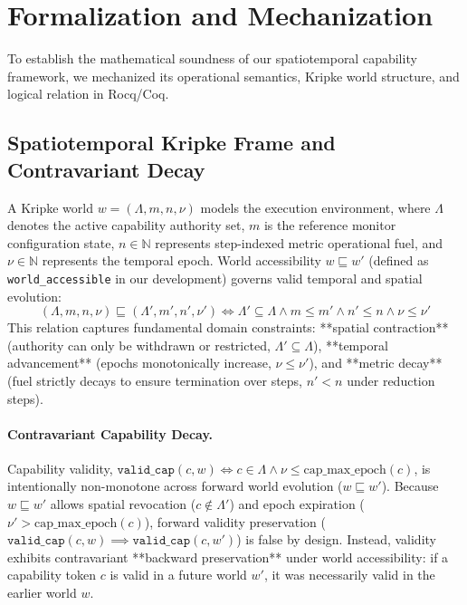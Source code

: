 \section{Formalization and Mechanization}
\label{sec:formalization}

To establish the mathematical soundness of our spatiotemporal capability framework, we mechanized its operational semantics, Kripke world structure, and logical relation in Rocq/Coq.

\subsection{Spatiotemporal Kripke Frame and Contravariant Decay}

A Kripke world $w = (\Lambda, m, n, \nu)$ models the execution environment, where $\Lambda$ denotes the active capability authority set, $m$ is the reference monitor configuration state, $n \in \mathbb{N}$ represents step-indexed metric operational fuel, and $\nu \in \mathbb{N}$ represents the temporal epoch. World accessibility $w \sqsubseteq w'$ (defined as \texttt{world\_accessible} in our development) governs valid temporal and spatial evolution:
\[
(\Lambda, m, n, \nu) \sqsubseteq (\Lambda', m', n', \nu') \iff \Lambda' \subseteq \Lambda \land m \le m' \land n' \le n \land \nu \le \nu'
\]
This relation captures fundamental domain constraints: **spatial contraction** (authority can only be withdrawn or restricted, $\Lambda' \subseteq \Lambda$), **temporal advancement** (epochs monotonically increase, $\nu \le \nu'$), and **metric decay** (fuel strictly decays to ensure termination over steps, $n' < n$ under reduction steps).

\paragraph{Contravariant Capability Decay.}
Capability validity, $\mathtt{valid\_cap}(c, w) \iff c \in \Lambda \land \nu \le \text{cap\_max\_epoch}(c)$, is intentionally non-monotone across forward world evolution ($w \sqsubseteq w'$). Because $w \sqsubseteq w'$ allows spatial revocation ($c \notin \Lambda'$) and epoch expiration ($\nu' > \text{cap\_max\_epoch}(c)$), forward validity preservation ($\mathtt{valid\_cap}(c, w) \implies \mathtt{valid\_cap}(c, w')$) is false by design. Instead, validity exhibits contravariant **backward preservation** under world accessibility: if a capability token $c$ is valid in a future world $w'$, it was necessarily valid in the earlier world $w$.

